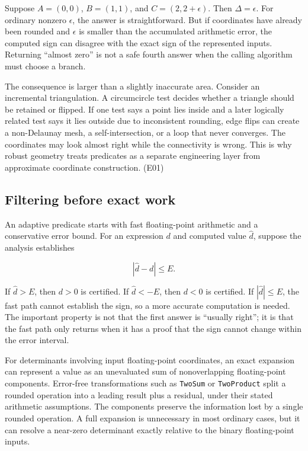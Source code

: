 Suppose \(A=(0,0)\), \(B=(1,1)\), and \(C=(2,2+\epsilon)\). Then \(\Delta=\epsilon\). For ordinary nonzero \(\epsilon\), the answer is straightforward. But if coordinates have already been rounded and \(\epsilon\) is smaller than the accumulated arithmetic error, the computed sign can disagree with the exact sign of the represented inputs. Returning ``almost zero'' is not a safe fourth answer when the calling algorithm must choose a branch.

The consequence is larger than a slightly inaccurate area. Consider an incremental triangulation. A circumcircle test decides whether a triangle should be retained or flipped. If one test says a point lies inside and a later logically related test says it lies outside due to inconsistent rounding, edge flips can create a non-Delaunay mesh, a self-intersection, or a loop that never converges. The coordinates may look almost right while the connectivity is wrong. This is why robust geometry treats predicates as a separate engineering layer from approximate coordinate construction. (E01)

\subsection{Filtering before exact work}\label{02-foundations-ii-ch034-filtering-before-exact-work}

An adaptive predicate starts with fast floating-point arithmetic and a conservative error bound. For an expression \(d\) and computed value \(\widehat d\), suppose the analysis establishes

\[
|\widehat d-d|\le E.
\]

If \(\widehat d>E\), then \(d>0\) is certified. If \(\widehat d<-E\), then \(d<0\) is certified. If \(|\widehat d|\le E\), the fast path cannot establish the sign, so a more accurate computation is needed. The important property is not that the first answer is ``usually right''; it is that the fast path only returns when it has a proof that the sign cannot change within the error interval.

For determinants involving input floating-point coordinates, an exact expansion can represent a value as an unevaluated sum of nonoverlapping floating-point components. Error-free transformations such as \texttt{TwoSum} or \texttt{TwoProduct} split a rounded operation into a leading result plus a residual, under their stated arithmetic assumptions. The components preserve the information lost by a single rounded operation. A full expansion is unnecessary in most ordinary cases, but it can resolve a near-zero determinant exactly relative to the binary floating-point inputs.

